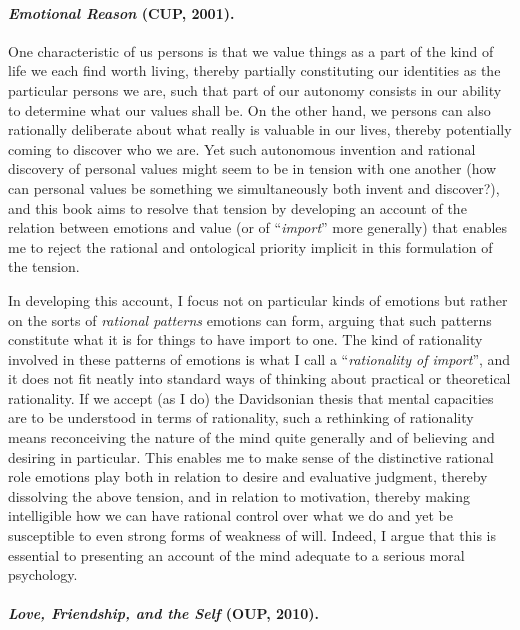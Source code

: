 \documentclass[%
  11pt,%
]{article}
\begin{document}
\paragraph{\emph{Emotional Reason} (CUP, 2001).}

One characteristic of us persons is that we value things as a part of the kind of life we each find worth living, thereby partially constituting our identities as the particular persons we are, such that part of our autonomy consists in our ability to determine what our values shall be. On the other hand, we persons can also rationally deliberate about what really is valuable in our lives, thereby potentially coming to discover who we are. Yet such autonomous invention and rational discovery of personal values might seem to be in tension with one another (how can personal values be something we simultaneously both invent and discover?), and this book aims to resolve that tension by developing an account of the relation between emotions and value (or of \enquote{\emph{import}} more generally) that enables me to reject the rational and ontological priority implicit in this formulation of the tension.

In developing this account, I focus not on particular kinds of emotions but rather on the sorts of \emph{rational patterns} emotions can form, arguing that such patterns constitute what it is for things to have import to one. The kind of rationality involved in these patterns of emotions is what I call a \enquote{\emph{rationality of import}}, and it does not fit neatly into standard ways of thinking about practical or theoretical rationality. If we accept (as I do) the Davidsonian thesis that mental capacities are to be understood in terms of rationality, such a rethinking of rationality means reconceiving the nature of the mind quite generally and of believing and desiring in particular. This enables me to make sense of the distinctive rational role emotions play both in relation to desire and evaluative judgment, thereby dissolving the above tension, and in relation to motivation, thereby making intelligible how we can have rational control over what we do and yet be susceptible to even strong forms of weakness of will. Indeed, I argue that this is essential to presenting an account of the mind adequate to a serious moral psychology.

\paragraph{\emph{Love, Friendship, and the Self} (OUP, 2010).}
\end{document}
